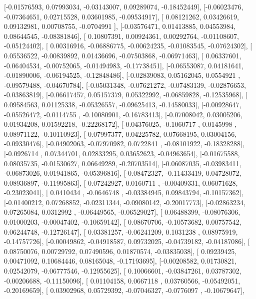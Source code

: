\documentclass{article}
\begin{document}
       [-0.01576593,  0.07993034, -0.03143007,  0.09289074, -0.18452449],
       [-0.06023476, -0.07364651,  0.02715528,  0.03601985, -0.09534917],
       [ 0.08121262,  0.03426619,  0.09132981,  0.00708755, -0.0704991 ],
       [-0.03576471,  0.01413885,  0.04553984,  0.08644545, -0.08381846],
       [ 0.10807391,  0.00924361,  0.00292764, -0.01108607, -0.05124402],
       [ 0.00316916, -0.06886775, -0.00624235, -0.01083545, -0.07624302],
       [ 0.05536522, -0.00839892,  0.01436696, -0.07503868, -0.06971463],
       [ 0.06337601, -0.06404534, -0.00752065, -0.01494983, -0.17738451],
       [-0.06553087,  0.04181641, -0.01890006, -0.06194525, -0.12848486],
       [-0.02839083,  0.05162045,  0.0554921 , -0.09579488, -0.04670784],
       [-0.05031348, -0.07621272, -0.07483139, -0.02876653, -0.03863819],
       [-0.06617457,  0.05157379,  0.05322992, -0.06859828, -0.12535968],
       [ 0.09584563,  0.01125338, -0.05326557, -0.09625413, -0.14580033],
       [-0.00928647, -0.05526472, -0.0114755 , -0.10080901, -0.16783413],
       [-0.07008042,  0.03005206,  0.01934208,  0.01592218, -0.22268172],
       [-0.04376025, -0.1060717 ,  0.0145998 ,  0.08971122, -0.10110923],
       [-0.07997377,  0.04225782,  0.07668195,  0.03004156, -0.09330476],
       [-0.04902063, -0.07970982,  0.0722841 , -0.08101922, -0.18328288],
       [-0.0926714 ,  0.07344701,  0.02833295,  0.03652623, -0.04963654],
       [-0.01675588,  0.08035735, -0.01530627,  0.06649289, -0.20703514],
       [-0.06087035, -0.03983411, -0.06873026,  0.01941865, -0.05396816],
       [-0.08472327, -0.11433419,  0.04728072,  0.08936897, -0.11995863],
       [ 0.07242927,  0.0160711 , -0.00409331,  0.06071628, -0.23023041],
       [ 0.0410434 , -0.0646748 , -0.03384945,  0.09843794, -0.10157362],
       [-0.01400212,  0.07268852, -0.02311344, -0.09080142, -0.20017773],
       [-0.02863234,  0.07265084,  0.0312992 , -0.06449565, -0.06529027],
       [ 0.06488399, -0.08076306,  0.01000203, -0.00047402, -0.10659142],
       [ 0.08670706, -0.10573682,  0.00757542,  0.06244748, -0.12726147],
       [ 0.03381257, -0.06241209,  0.1031238 ,  0.08975919, -0.14757726],
       [-0.00049862, -0.04918587,  0.09732025, -0.04739182, -0.04187086],
       [ 0.08750076,  0.00729792,  0.07490596,  0.01870574, -0.03835038],
       [ 0.09239425,  0.00471092,  0.10684446,  0.08165048, -0.17193695],
       [-0.00208582,  0.01730821,  0.02542079, -0.06777546, -0.12955625],
       [ 0.10066601, -0.03847261,  0.03787302, -0.00206688, -0.11150096],
       [ 0.01104158,  0.0667118 ,  0.03760566, -0.05492051, -0.20169659],
       [ 0.03902968,  0.05729392, -0.07046327, -0.0776097 , -0.10679647],
\end{document}
